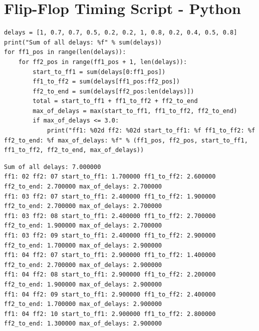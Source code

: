 \documentclass[11pt]{article}
\begin{document}
\section{Flip-Flop Timing Script - Python}
\begin{verbatim}
delays = [1, 0.7, 0.7, 0.5, 0.2, 0.2, 1, 0.8, 0.2, 0.4, 0.5, 0.8]
print("Sum of all delays: %f" % sum(delays))
for ff1_pos in range(len(delays)):
	for ff2_pos in range(ff1_pos + 1, len(delays)):
		start_to_ff1 = sum(delays[0:ff1_pos])
		ff1_to_ff2 = sum(delays[ff1_pos:ff2_pos])
		ff2_to_end = sum(delays[ff2_pos:len(delays)])
		total = start_to_ff1 + ff1_to_ff2 + ff2_to_end
		max_of_delays = max(start_to_ff1, ff1_to_ff2, ff2_to_end)
		if max_of_delays <= 3.0:
			print("ff1: %02d ff2: %02d start_to_ff1: %f ff1_to_ff2: %f ff2_to_end: %f max_of_delays: %f" % (ff1_pos, ff2_pos, start_to_ff1, ff1_to_ff2, ff2_to_end, max_of_delays))
\end{verbatim}
\begin{verbatim}
Sum of all delays: 7.000000
ff1: 02 ff2: 07 start_to_ff1: 1.700000 ff1_to_ff2: 2.600000 ff2_to_end: 2.700000 max_of_delays: 2.700000
ff1: 03 ff2: 07 start_to_ff1: 2.400000 ff1_to_ff2: 1.900000 ff2_to_end: 2.700000 max_of_delays: 2.700000
ff1: 03 ff2: 08 start_to_ff1: 2.400000 ff1_to_ff2: 2.700000 ff2_to_end: 1.900000 max_of_delays: 2.700000
ff1: 03 ff2: 09 start_to_ff1: 2.400000 ff1_to_ff2: 2.900000 ff2_to_end: 1.700000 max_of_delays: 2.900000
ff1: 04 ff2: 07 start_to_ff1: 2.900000 ff1_to_ff2: 1.400000 ff2_to_end: 2.700000 max_of_delays: 2.900000
ff1: 04 ff2: 08 start_to_ff1: 2.900000 ff1_to_ff2: 2.200000 ff2_to_end: 1.900000 max_of_delays: 2.900000
ff1: 04 ff2: 09 start_to_ff1: 2.900000 ff1_to_ff2: 2.400000 ff2_to_end: 1.700000 max_of_delays: 2.900000
ff1: 04 ff2: 10 start_to_ff1: 2.900000 ff1_to_ff2: 2.800000 ff2_to_end: 1.300000 max_of_delays: 2.900000
\end{verbatim}
\end{document}
